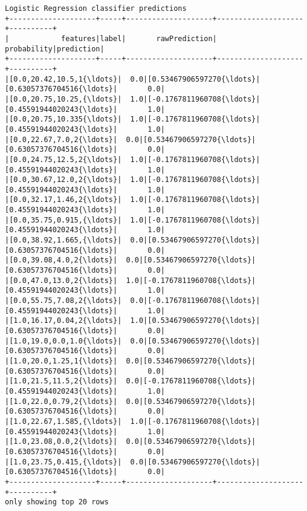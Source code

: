 \documentclass{report}
\begin{document}
    \begin{Verbatim}[commandchars=\\\{\}]
Logistic Regression classifier predictions
+--------------------+-----+--------------------+--------------------+----------+
|            features|label|       rawPrediction|         probability|prediction|
+--------------------+-----+--------------------+--------------------+----------+
|[0.0,20.42,10.5,1{\ldots}|  0.0|[0.53467906597270{\ldots}|[0.63057376704516{\ldots}|       0.0|
|[0.0,20.75,10.25,{\ldots}|  1.0|[-0.1767811960708{\ldots}|[0.45591944020243{\ldots}|       1.0|
|[0.0,20.75,10.335{\ldots}|  1.0|[-0.1767811960708{\ldots}|[0.45591944020243{\ldots}|       1.0|
|[0.0,22.67,7.0,2{\ldots}|  0.0|[0.53467906597270{\ldots}|[0.63057376704516{\ldots}|       0.0|
|[0.0,24.75,12.5,2{\ldots}|  1.0|[-0.1767811960708{\ldots}|[0.45591944020243{\ldots}|       1.0|
|[0.0,30.67,12.0,2{\ldots}|  1.0|[-0.1767811960708{\ldots}|[0.45591944020243{\ldots}|       1.0|
|[0.0,32.17,1.46,2{\ldots}|  1.0|[-0.1767811960708{\ldots}|[0.45591944020243{\ldots}|       1.0|
|[0.0,35.75,0.915,{\ldots}|  1.0|[-0.1767811960708{\ldots}|[0.45591944020243{\ldots}|       1.0|
|[0.0,38.92,1.665,{\ldots}|  0.0|[0.53467906597270{\ldots}|[0.63057376704516{\ldots}|       0.0|
|[0.0,39.08,4.0,2{\ldots}|  0.0|[0.53467906597270{\ldots}|[0.63057376704516{\ldots}|       0.0|
|[0.0,47.0,13.0,2{\ldots}|  1.0|[-0.1767811960708{\ldots}|[0.45591944020243{\ldots}|       1.0|
|[0.0,55.75,7.08,2{\ldots}|  0.0|[-0.1767811960708{\ldots}|[0.45591944020243{\ldots}|       1.0|
|[1.0,16.17,0.04,2{\ldots}|  1.0|[0.53467906597270{\ldots}|[0.63057376704516{\ldots}|       0.0|
|[1.0,19.0,0.0,1.0{\ldots}|  0.0|[0.53467906597270{\ldots}|[0.63057376704516{\ldots}|       0.0|
|[1.0,20.0,1.25,1{\ldots}|  0.0|[0.53467906597270{\ldots}|[0.63057376704516{\ldots}|       0.0|
|[1.0,21.5,11.5,2{\ldots}|  0.0|[-0.1767811960708{\ldots}|[0.45591944020243{\ldots}|       1.0|
|[1.0,22.0,0.79,2{\ldots}|  0.0|[0.53467906597270{\ldots}|[0.63057376704516{\ldots}|       0.0|
|[1.0,22.67,1.585,{\ldots}|  1.0|[-0.1767811960708{\ldots}|[0.45591944020243{\ldots}|       1.0|
|[1.0,23.08,0.0,2{\ldots}|  0.0|[0.53467906597270{\ldots}|[0.63057376704516{\ldots}|       0.0|
|[1.0,23.75,0.415,{\ldots}|  0.0|[0.53467906597270{\ldots}|[0.63057376704516{\ldots}|       0.0|
+--------------------+-----+--------------------+--------------------+----------+
only showing top 20 rows


\end{Verbatim}
\end{document}
